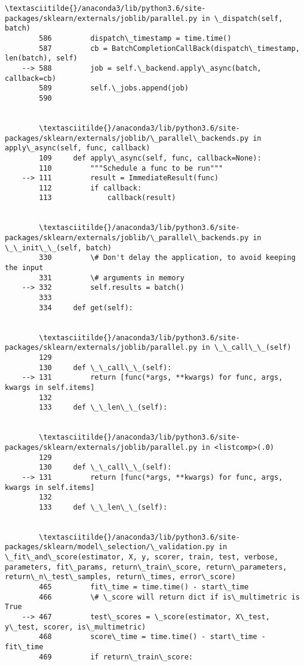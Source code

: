 \documentclass[11pt]{article}
\begin{document}
\begin{Verbatim}[commandchars=\\\{\}]
        \textasciitilde{}/anaconda3/lib/python3.6/site-packages/sklearn/externals/joblib/parallel.py in \_dispatch(self, batch)
        586         dispatch\_timestamp = time.time()
        587         cb = BatchCompletionCallBack(dispatch\_timestamp, len(batch), self)
    --> 588         job = self.\_backend.apply\_async(batch, callback=cb)
        589         self.\_jobs.append(job)
        590 


        \textasciitilde{}/anaconda3/lib/python3.6/site-packages/sklearn/externals/joblib/\_parallel\_backends.py in apply\_async(self, func, callback)
        109     def apply\_async(self, func, callback=None):
        110         """Schedule a func to be run"""
    --> 111         result = ImmediateResult(func)
        112         if callback:
        113             callback(result)


        \textasciitilde{}/anaconda3/lib/python3.6/site-packages/sklearn/externals/joblib/\_parallel\_backends.py in \_\_init\_\_(self, batch)
        330         \# Don't delay the application, to avoid keeping the input
        331         \# arguments in memory
    --> 332         self.results = batch()
        333 
        334     def get(self):


        \textasciitilde{}/anaconda3/lib/python3.6/site-packages/sklearn/externals/joblib/parallel.py in \_\_call\_\_(self)
        129 
        130     def \_\_call\_\_(self):
    --> 131         return [func(*args, **kwargs) for func, args, kwargs in self.items]
        132 
        133     def \_\_len\_\_(self):


        \textasciitilde{}/anaconda3/lib/python3.6/site-packages/sklearn/externals/joblib/parallel.py in <listcomp>(.0)
        129 
        130     def \_\_call\_\_(self):
    --> 131         return [func(*args, **kwargs) for func, args, kwargs in self.items]
        132 
        133     def \_\_len\_\_(self):


        \textasciitilde{}/anaconda3/lib/python3.6/site-packages/sklearn/model\_selection/\_validation.py in \_fit\_and\_score(estimator, X, y, scorer, train, test, verbose, parameters, fit\_params, return\_train\_score, return\_parameters, return\_n\_test\_samples, return\_times, error\_score)
        465         fit\_time = time.time() - start\_time
        466         \# \_score will return dict if is\_multimetric is True
    --> 467         test\_scores = \_score(estimator, X\_test, y\_test, scorer, is\_multimetric)
        468         score\_time = time.time() - start\_time - fit\_time
        469         if return\_train\_score:



\end{Verbatim}
\end{document}
